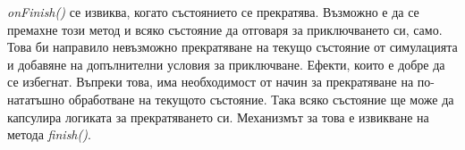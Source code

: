 		\emph{onFinish()} се извиква, когато състоянието се прекратява. Възможно е да се премахне този метод и 
		всяко състояние да отговаря за приключването си, само. Това би направило невъзможно
		прекратяване на текущо състояние от симулацията и добавяне на допълнителни условия за приключване. 
		Ефекти, които е добре да се избегнат. Въпреки това, има необходимост от начин за прекратяване на по-нататъшно обработване
		на текущото състояние. Така всяко състояние ще може да капсулира логиката за прекратяването си. Механизмът
		за това е извикване на метода \emph{finish()}.

		
